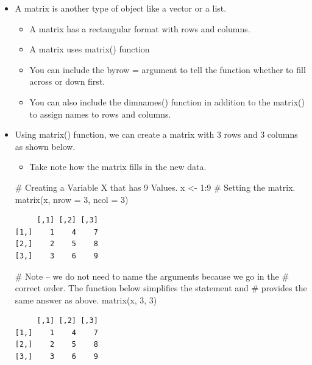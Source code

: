 \documentclass[
  letterpaper,
  DIV=11,
  numbers=noendperiod]{scrreprt}
\newenvironment{Shaded}{\begin{snugshade}}{\end{snugshade}}
\newcommand{\AttributeTok}[1]{\textcolor[rgb]{0.40,0.45,0.13}{#1}}
\newcommand{\CommentTok}[1]{\textcolor[rgb]{0.37,0.37,0.37}{#1}}
\newcommand{\DecValTok}[1]{\textcolor[rgb]{0.68,0.00,0.00}{#1}}
\newcommand{\FunctionTok}[1]{\textcolor[rgb]{0.28,0.35,0.67}{#1}}
\newcommand{\NormalTok}[1]{\textcolor[rgb]{0.00,0.23,0.31}{#1}}
\newcommand{\OtherTok}[1]{\textcolor[rgb]{0.00,0.23,0.31}{#1}}
\newcommand{\SpecialCharTok}[1]{\textcolor[rgb]{0.37,0.37,0.37}{#1}}
\providecommand{\tightlist}{%
  \setlength{\itemsep}{0pt}\setlength{\parskip}{0pt}}\usepackage{longtable,booktabs,array}
\begin{document}
\begin{itemize}
\item
  A matrix is another type of object like a vector or a list.

  \begin{itemize}
  \tightlist
  \item
    A matrix has a rectangular format with rows and columns.
  \item
    A matrix uses matrix() function
  \item
    You can include the byrow = argument to tell the function whether to
    fill across or down first.
  \item
    You can also include the dimnames() function in addition to the
    matrix() to assign names to rows and columns.
  \end{itemize}
\item
  Using matrix() function, we can create a matrix with 3 rows and 3
  columns as shown below.

  \begin{itemize}
  \tightlist
  \item
    Take note how the matrix fills in the new data.
  \end{itemize}

\begin{Shaded}
\begin{Highlighting}[]
\CommentTok{\# Creating a Variable X that has 9 Values.}
\NormalTok{x }\OtherTok{\textless{}{-}} \DecValTok{1}\SpecialCharTok{:}\DecValTok{9}
\CommentTok{\# Setting the matrix.}
\FunctionTok{matrix}\NormalTok{(x, }\AttributeTok{nrow =} \DecValTok{3}\NormalTok{, }\AttributeTok{ncol =} \DecValTok{3}\NormalTok{)}
\end{Highlighting}
\end{Shaded}

\begin{verbatim}
     [,1] [,2] [,3]
[1,]    1    4    7
[2,]    2    5    8
[3,]    3    6    9
\end{verbatim}

\begin{Shaded}
\begin{Highlighting}[]
\CommentTok{\# Note – we do not need to name the arguments because we go in the}
\CommentTok{\# correct order.  The function below simplifies the statement and}
\CommentTok{\# provides the same answer as above.}
\FunctionTok{matrix}\NormalTok{(x, }\DecValTok{3}\NormalTok{, }\DecValTok{3}\NormalTok{)}
\end{Highlighting}
\end{Shaded}

\begin{verbatim}
     [,1] [,2] [,3]
[1,]    1    4    7
[2,]    2    5    8
[3,]    3    6    9
\end{verbatim}
\end{itemize}
\end{document}
